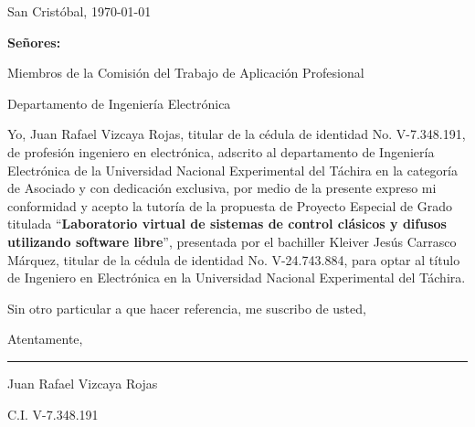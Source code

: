 \begin{titlepage}
\setcounter{page}{3}
\setlength{\parindent}{1.5cm}					%
\setlength{\parskip}{0pt}						%

\begin{flushright}
	San Cristóbal, \today
\end{flushright}

\vspace{1cm}
\vfill

\begin{flushleft}
		\singlespacing
		
		\setlength{\parskip}{0pt}
		
		\textbf{Señores:}
		
		Miembros de la Comisión del Trabajo de Aplicación Profesional
		
		Departamento de Ingeniería Electrónica
		
\end{flushleft}

\vfill
\begin{spacing}{1.5}
	Yo, Juan Rafael Vizcaya Rojas, titular de la cédula de identidad No. \mbox{V-7.348.191}, de profesión ingeniero en electrónica, adscrito al departamento de Ingeniería Electrónica de la Universidad Nacional Experimental del Táchira en la categoría de Asociado y con dedicación exclusiva, por medio de la presente expreso mi conformidad y acepto la tutoría de la propuesta de Proyecto Especial de Grado titulada \enquote{\textbf{Laboratorio virtual de sistemas de control clásicos y difusos utilizando software libre}}, presentada por el bachiller Kleiver Jesús Carrasco Márquez, titular de la cédula de identidad No. \mbox{V-24.743.884}, para optar al título de Ingeniero en Electrónica en la Universidad Nacional Experimental del Táchira.
	
	Sin otro particular a que hacer referencia, me suscribo de usted,
	
	\setlength{\parskip}{20pt} 
	
	\noindent Atentamente,
\end{spacing}

\vfill

\begin{center}
	
	\rule{6cm}{1pt}
	
	\vspace{0.2cm}
	
	Juan Rafael Vizcaya Rojas
	
	\setlength{\parskip}{0pt}
	
	C.I. V-7.348.191
\end{center}

\vspace{0.5cm}
\end{titlepage}